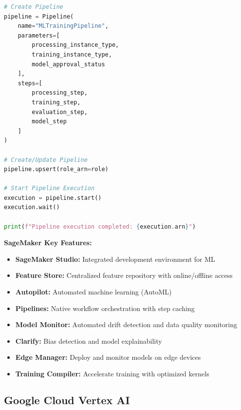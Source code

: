 \begin{lstlisting}[language=Python, caption=AWS SageMaker Training and Deployment]
# Create Pipeline
pipeline = Pipeline(
    name="MLTrainingPipeline",
    parameters=[
        processing_instance_type,
        training_instance_type,
        model_approval_status
    ],
    steps=[
        processing_step,
        training_step,
        evaluation_step,
        model_step
    ]
)

# Create/Update Pipeline
pipeline.upsert(role_arn=role)

# Start Pipeline Execution
execution = pipeline.start()
execution.wait()

print(f"Pipeline execution completed: {execution.arn}")
\end{lstlisting}

\textbf{SageMaker Key Features:}

\begin{itemize}
    \item \textbf{SageMaker Studio:} Integrated development environment for ML
    \item \textbf{Feature Store:} Centralized feature repository with online/offline access
    \item \textbf{Autopilot:} Automated machine learning (AutoML)
    \item \textbf{Pipelines:} Native workflow orchestration with step caching
    \item \textbf{Model Monitor:} Automated drift detection and data quality monitoring
    \item \textbf{Clarify:} Bias detection and model explainability
    \item \textbf{Edge Manager:} Deploy and monitor models on edge devices
    \item \textbf{Training Compiler:} Accelerate training with optimized kernels
\end{itemize}

\subsection{Google Cloud Vertex AI}

